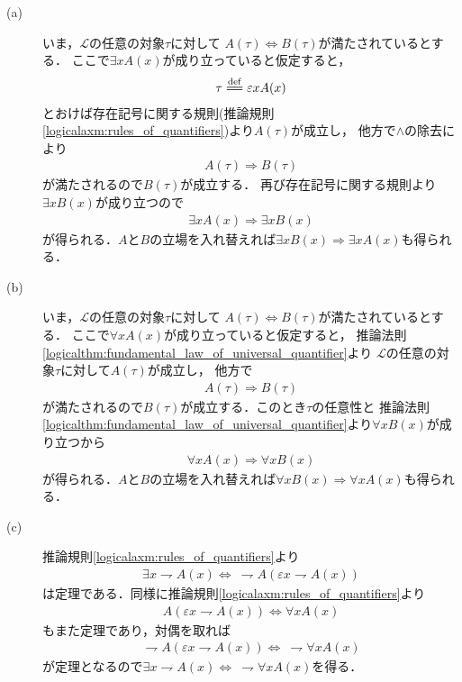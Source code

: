 	\begin{prf}\mbox{}
		\begin{description}
			\item[(a)]
				いま，$\mathcal{L}$の任意の対象$\tau$に対して
				$A(\tau) \Longleftrightarrow B(\tau)$が満たされているとする．
				ここで$\exists x A(x)$が成り立っていると仮定すると，
				\begin{align}
					\tau \defeq \varepsilon x A(x)
				\end{align}
				とおけば存在記号に関する規則(推論規則\ref{logicalaxm:rules_of_quantifiers})より$A(\tau)$が成立し，
				他方で$\wedge$の除去により
				\begin{align}
					A(\tau) \Longrightarrow B(\tau)
				\end{align}
				が満たされるので$B(\tau)$が成立する．
				再び存在記号に関する規則より$\exists x B(x)$が成り立つので
				\begin{align}
					\exists x A(x) \Longrightarrow \exists x B(x)
				\end{align}
				が得られる．$A$と$B$の立場を入れ替えれば$\exists x B(x) \Longrightarrow \exists x A(x)$も得られる．
				
			\item[(b)]
				いま，$\mathcal{L}$の任意の対象$\tau$に対して
				$A(\tau) \Longleftrightarrow B(\tau)$が満たされているとする．
				ここで$\forall x A(x)$が成り立っていると仮定すると，
				推論法則\ref{logicalthm:fundamental_law_of_universal_quantifier}より
				$\mathcal{L}$の任意の対象$\tau$に対して$A(\tau)$が成立し，
				他方で
				\begin{align}
					A(\tau) \Longrightarrow B(\tau)
				\end{align}
				が満たされるので$B(\tau)$が成立する．このとき$\tau$の任意性と
				推論法則\ref{logicalthm:fundamental_law_of_universal_quantifier}より$\forall x B(x)$が成り立つから
				\begin{align}
					\forall x A(x) \Longrightarrow \forall x B(x)
				\end{align}
				が得られる．$A$と$B$の立場を入れ替えれば$\forall x B(x) \Longrightarrow \forall x A(x)$も得られる．
				
			\item[(c)]
				推論規則\ref{logicalaxm:rules_of_quantifiers}より
				\begin{align}
					\exists x \rightharpoondown A(x) \Longleftrightarrow\ 
					\rightharpoondown A(\varepsilon x \rightharpoondown A(x))
				\end{align}
				は定理である．同様に推論規則\ref{logicalaxm:rules_of_quantifiers}より
				\begin{align}
					A(\varepsilon x \rightharpoondown A(x)) \Longleftrightarrow \forall x A(x) 
				\end{align}
				もまた定理であり，対偶を取れば
				\begin{align}
					\rightharpoondown A(\varepsilon x \rightharpoondown A(x)) \Longleftrightarrow\ 
					\rightharpoondown \forall x A(x)
				\end{align}
				が定理となるので$\exists x \rightharpoondown A(x) \Longleftrightarrow\ \rightharpoondown \forall x A(x)$を得る．
			

\end{description}
\end{prf}
